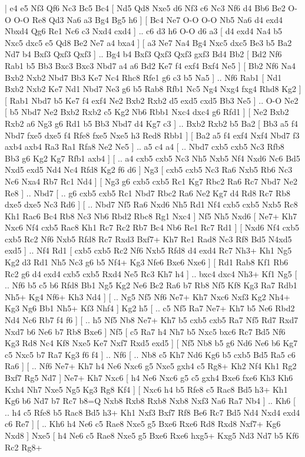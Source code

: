 \makegametitle 
|   e4   e5    Nf3   Qf6    Nc3   Bc5    Bc4 [  Nd5 Qd8  Nxe5 d6  Nf3 c6  Nc3 Nf6  d4 Bb6  Be2 O-O  O-O Re8  Qd3 Na6  a3 Bg4  Bg5 h6   ]  [  Bc4 Ne7  O-O O-O  Nb5 Na6  d4 exd4  Nbxd4 Qg6  Re1 Nc6  c3 Nxd4  cxd4   ] .. c6    d3   h6    O-O   d6    a3    [  d4 exd4  Na4 b5  Nxc5 dxc5  e5 Qd8  Be2 Ne7  a4 bxa4   ]  [  a3 Ne7  Na4 Bg4  Nxc5 dxc5  Be3 b5  Ba2 Nd7  b4 Bxf3  Qxf3 Qxf3   ] .. Bg4    b4   Bxf3    Qxf3   Qxf3    gxf3   Bd4    Bb2 [  Bd2 Nf6  Rab1 b5  Bb3 Bxc3  Bxc3 Nbd7  a4 a6  Bd2 Ke7  f4 exf4  Bxf4 Ne5   ]  [  Bb2 Nf6  Na4 Bxb2  Nxb2 Nbd7  Bb3 Ke7  Nc4 Rhc8  Rfe1 g6  c3 b5  Na5   ] .. Nf6    Rab1    [  Nd1 Bxb2  Nxb2 Ke7  Nd1 Nbd7  Ne3 g6  b5 Rab8  Rfb1 Nc5  Ng4 Nxg4  fxg4 Rhd8  Kg2   ]  [  Rab1 Nbd7  b5 Ke7  f4 exf4  Ne2 Bxb2  Rxb2 d5  exd5 cxd5  Bb3 Ne5   ] .. O-O    Ne2    [  b5 Nbd7  Ne2 Bxb2  Rxb2 c5  Kg2 Nb6  Rbb1 Nxc4  dxc4 g6  Rfd1   ]  [  Ne2 Bxb2  Rxb2 a6  Ng3 g6  Rd1 b5  Bb3 Nbd7  d4 Kg7  c3   ] .. Bxb2    Rxb2   b5    Ba2    [  Bb3 a5  f4 Nbd7  fxe5 dxe5  f4 Rfe8  fxe5 Nxe5  h3 Red8  Rbb1   ]  [  Ba2 a5  f4 exf4  Nxf4 Nbd7  f3 axb4  axb4 Ra3  Ra1 Rfa8  Ne2 Ne5   ] .. a5    c4   a4 [ .. Nbd7  cxb5 cxb5  Nc3 Rfb8  Bb3 g6  Kg2 Kg7  Rfb1 axb4   ]  [ .. a4  cxb5 cxb5  Nc3 Nh5  Nxb5 Nf4  Nxd6 Nc6  Bd5 Nxd5  exd5 Nd4  Nc4 Rfd8  Kg2 f6  d6   ]  Ng3 [  cxb5 cxb5  Nc3 Ra6  Nxb5 Rb6  Nc3 Nc6  Nxa4 Rb7  Rc1 Nd4   ]  [  Ng3 g6  cxb5 cxb5  Rc1 Kg7  Rbc2 Ra6  Rc7 Nbd7  Ne2 Re8   ] .. Nbd7 [ .. g6  cxb5 cxb5  Rc1 Nbd7  Rbc2 Ra6  Ne2 Kg7  d4 Rd8  Rc7 Rb8  dxe5 dxe5  Nc3 Rd6   ]  [ .. Nbd7  Nf5 Ra6  Nxd6 Nh5  Rd1 Nf4  cxb5 cxb5  Nxb5 Rc8  Kh1 Rac6  Bc4 Rb8  Nc3 Nb6  Rbd2 Rbc8  Rg1 Nxc4   ]  Nf5   Nh5    Nxd6 [  Ne7+ Kh7  Nxc6 Nf4  cxb5 Rac8  Kh1 Rc7  Rc2 Rb7  Bc4 Nb6  Re1 Rc7  Rd1   ]  [  Nxd6 Nf4  cxb5 cxb5  Rc2 Nf6  Nxb5 Rfd8  Rc7 Rxd3  Bxf7+ Kh7  Re1 Rad8  Nc3 Rf8  Bd5 N4xd5  exd5   ] .. Nf4    Rd1 [  cxb5 cxb5  Rc2 Nf6  Nxb5 Rfd8  d4 exd4  Rc7 Nh3+  Kh1 Ng5  Kg2 d3  Rd1 Nh5  Nc3 g6  b5 Nf4+  Kg3 Nfe6  Bxe6 Nxe6   ]  [  Rd1 Rab8  Kf1 Rb6  Rc2 g6  d4 exd4  cxb5 cxb5  Rxd4 Ne5  Rc3 Kh7  h4   ] .. bxc4    dxc4   Nh3+    Kf1   Ng5 [ .. Nf6  b5 c5  b6 Rfd8  Bb1 Ng5  Kg2 Ne6  Bc2 Ra6  b7 Rb8  Nf5 Kf8  Kg3 Ra7  Rdb1 Nh5+  Kg4 Nf6+  Kh3 Nd4   ]  [ .. Ng5  Nf5 Nf6  Ne7+ Kh7  Nxc6 Nxf3  Kg2 Nh4+  Kg3 Ng6  Bb1 Nh5+  Kf3 Nhf4   ]  Kg2   h5 [ .. c5  Nf5 Ra7  Ne7+ Kh7  b5 Ne6  Rbd2 Nd4  Nc6 Rb7  f4 f6   ]  [ .. h5  Nf5 Nb8  Ne7+ Kh7  b5 cxb5  cxb5 Ra7  Nf5 Rd7  Rxd7 Nxd7  b6 Ne6  b7 Rb8  Bxe6   ]  Nf5 [  c5 Ra7  h4 Nh7  b5 Nxc5  bxc6 Rc7  Bd5 Nf6  Kg3 Rd8  Nc4 Kf8  Nxe5 Ke7  Nxf7 Rxd5  exd5   ]  [  Nf5 Nb8  b5 g6  Nd6 Ne6  b6 Kg7  c5 Nxc5  b7 Ra7  Kg3 f6  f4   ] .. Nf6 [ .. Nb8  c5 Kh7  Nd6 Kg6  b5 cxb5  Bd5 Ra5  c6 Ra6   ]  [ .. Nf6  Ne7+ Kh7  h4 Ne6  Nxc6 g5  Nxe5 gxh4  c5 Rg8+  Kh2 Nf4  Kh1 Rg2  Bxf7 Rg5  Nd7   ]  Ne7+   Kh7    Nxc6 [  h4 Ne6  Nxc6 g5  c5 gxh4  Bxe6 fxe6  Kh3 Kh6  Kxh4 Nh7  Nxe5 Ng5  Kg3 Rg8  Kf4   ]  [  Nxc6 h4  b5 Rfe8  c5 Rac8  Bd5 h3+  Kh1 Kg6  b6 Nd7  b7 Rc7  b8=Q Nxb8  Rxb8 Rxb8  Nxb8 Nxf3  Na6 Ra7  Nb4   ] .. Kh6 [ .. h4  c5 Rfe8  b5 Rac8  Bd5 h3+  Kh1 Nxf3  Bxf7 Rf8  Be6 Rc7  Bd5 Nd4  Nxd4 exd4  c6 Re7   ]  [ .. Kh6  h4 Ne6  c5 Rae8  Nxe5 g5  Bxe6 Rxe6  Rd8 Rxd8  Nxf7+ Kg6  Nxd8   ]  Nxe5 [  h4 Ne6  c5 Rae8  Nxe5 g5  Bxe6 Rxe6  hxg5+ Kxg5  Nd3 Nd7  b5 Kf6  Rc2 Rg8+  